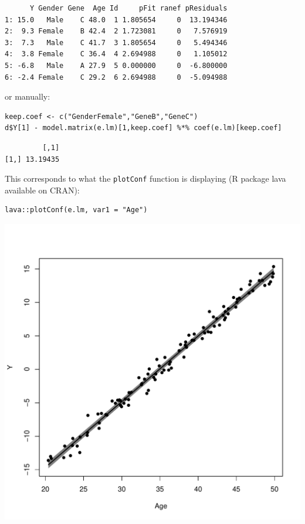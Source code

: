 \documentclass{article}
\begin{document}
\begin{verbatim}
      Y Gender Gene  Age Id     pFit ranef pResiduals
1: 15.0   Male    C 48.0  1 1.805654     0  13.194346
2:  9.3 Female    B 42.4  2 1.723081     0   7.576919
3:  7.3   Male    C 41.7  3 1.805654     0   5.494346
4:  3.8 Female    C 36.4  4 2.694988     0   1.105012
5: -6.8   Male    A 27.9  5 0.000000     0  -6.800000
6: -2.4 Female    C 29.2  6 2.694988     0  -5.094988
\end{verbatim}

or manually: 
\lstset{language=r,label= ,caption= ,captionpos=b,numbers=none}
\begin{lstlisting}
keep.coef <- c("GenderFemale","GeneB","GeneC")
d$Y[1] - model.matrix(e.lm)[1,keep.coef] %*% coef(e.lm)[keep.coef]
\end{lstlisting}

\begin{verbatim}
         [,1]
[1,] 13.19435
\end{verbatim}

This corresponds to what the \texttt{plotConf} function is displaying (R
package lava available on CRAN):
\lstset{language=r,label= ,caption= ,captionpos=b,numbers=none}
\begin{lstlisting}
lava::plotConf(e.lm, var1 = "Age")
\end{lstlisting}

\begin{center}
\includegraphics[width=.9\linewidth]{./figures/fig-lava-plotConf.pdf}
\end{center}
\end{document}
